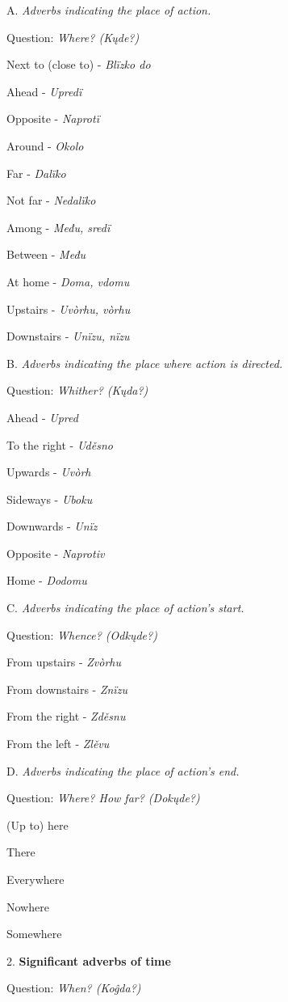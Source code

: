 A. \textit{Adverbs indicating the place of action.}

Question: \textit{Where? (Kųde?)}

Next to (close to) - \textit{Blïzko do}

Ahead - \textit{Upredï}

Opposite - \textit{Naprotï}

Around - \textit{Okolo}

Far - \textit{Dalïko}

Not far - \textit{Nedalïko}

Among - \textit{Među, sredï}

Between - \textit{Među}

At home -\textit{ Doma, vdomu}

Upstairs - \textit{Uvòrhu, vòrhu}

Downstairs - \textit{Unïzu, nïzu}

B. \textit{Adverbs indicating the place where action is directed. }

Question:\textit{ Whither? (Kųda?)}

Ahead - \textit{Upred}

To the right - \textit{Uděsno}

Upwards - \textit{Uvòrh}

Sideways - \textit{Uboku}

Downwards - \textit{Unïz}

Opposite - \textit{Naprotiv}

Home - \textit{Dodomu}

C. \textit{Adverbs indicating the place of action’s start.}

Question: \textit{Whence? (Odkųde?)}

From upstairs - \textit{Zvòrhu}

From downstairs - \textit{Znïzu}

From the right - \textit{Zděsnu}

From the left - \textit{Zlěvu}

D. \textit{Adverbs indicating the place of action’s end.}

Question: \textit{Where? How far? (Dokųde?)}

(Up to) here

There

Everywhere

Nowhere

Somewhere


2. \textbf{Significant adverbs of time}

Question: \textit{When? (Koĝda?)}

